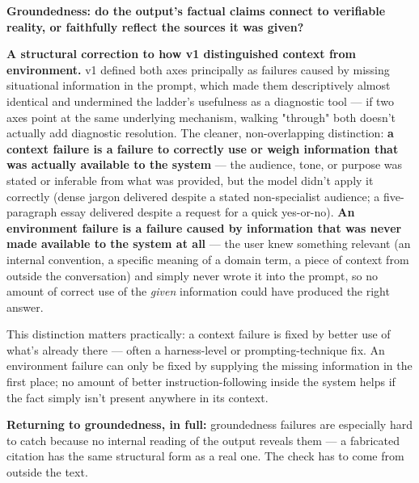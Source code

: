 \textbf{Groundedness: do the output's factual claims connect to verifiable reality, or faithfully reflect the sources it was given?}

\textbf{A structural correction to how v1 distinguished context from environment.} v1 defined both axes principally as failures caused by missing situational information in the prompt, which made them descriptively almost identical and undermined the ladder's usefulness as a diagnostic tool --- if two axes point at the same underlying mechanism, walking "through" both doesn't actually add diagnostic resolution. The cleaner, non-overlapping distinction: \textbf{a context failure is a failure to correctly use or weigh information that was actually available to the system} --- the audience, tone, or purpose was stated or inferable from what was provided, but the model didn't apply it correctly (dense jargon delivered despite a stated non-specialist audience; a five-paragraph essay delivered despite a request for a quick yes-or-no). \textbf{An environment failure is a failure caused by information that was never made available to the system at all} --- the user knew something relevant (an internal convention, a specific meaning of a domain term, a piece of context from outside the conversation) and simply never wrote it into the prompt, so no amount of correct use of the \emph{given} information could have produced the right answer.

This distinction matters practically: a context failure is fixed by better use of what's already there --- often a harness-level or prompting-technique fix. An environment failure can only be fixed by supplying the missing information in the first place; no amount of better instruction-following inside the system helps if the fact simply isn't present anywhere in its context.

\textbf{Returning to groundedness, in full:} groundedness failures are especially hard to catch because no internal reading of the output reveals them --- a fabricated citation has the same structural form as a real one. The check has to come from outside the text.

